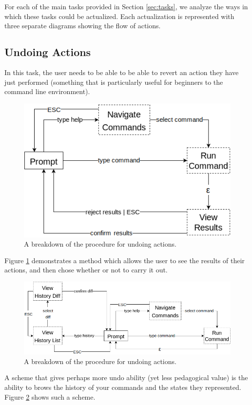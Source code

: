 For each of the main tasks provided in Section \ref{sec:tasks}, we analyze the
ways in which these tasks could be actualized. Each actualization is represented
with three separate diagrams showing the flow of actions.

\subsection{Undoing Actions}

In this task, the user needs to be able to be able to revert an action they have
just performed (something that is particularly useful for beginners to the
command line environment).
\begin{figure}[H]
  \centering
  \includegraphics[width=0.8\linewidth]{figures/alternatives/undo_a.png}
  \caption{A breakdown of the procedure for undoing actions.}
  \label{fig:undoa}
\end{figure}

Figure \ref{fig:undoa} demonstrates a method which allows the user to see the
results of their actions, and then chose whether or not to carry it out.

\begin{figure}[H]
  \centering
  \includegraphics[width=0.8\linewidth]{figures/alternatives/undo_b.png}
  \caption{A breakdown of the procedure for undoing actions.}
  \label{fig:undob}
\end{figure}

A scheme that gives perhaps more undo ability (yet less pedagogical value) is
the ability to brows the history of your commands and the states they
represented. Figure \ref{fig:undob} shows such a scheme.

